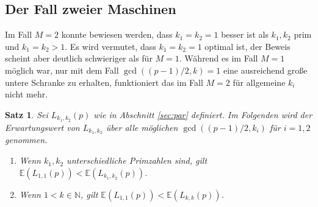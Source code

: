 \documentclass[a4paper, 10pt, ngerman]{article}
\newcommand{\E}{\mathbb{E}}
\newcommand{\N}{\mathbb{N}}
\newtheorem{theorem}{Satz}
\begin{document}
\subsection{Der Fall zweier Maschinen}

Im Fall $M = 2$ konnte bewiesen werden, dass $k_1 = k_2 = 1$ besser ist als $k_1, k_2$ prim und $k_1 = k_2 > 1$. Es wird vermutet, dass $k_1 = k_2 = 1$ optimal ist, der Beweis scheint aber deutlich schwieriger als für $M = 1$. Während es im Fall $M = 1$ möglich war, nur mit dem Fall $\gcd((p - 1)/2, k) = 1$ eine ausreichend große untere Schranke zu erhalten, funktioniert das im Fall $M = 2$ für allgemeine $k_i$ nicht mehr.

\begin{theorem}
    Sei $L_{k_1, k_2}(p)$ wie in Abschnitt \ref{sec:par} definiert. Im Folgenden wird der Erwartungswert von $L_{k_1, k_2}$ über alle möglichen $\gcd((p - 1)/2, k_i)$ für $i = 1, 2$ genommen.
    \begin{enumerate}
        \item Wenn $k_1, k_2$ unterschiedliche Primzahlen sind, gilt $\E(L_{1, 1}(p)) < \E(L_{k_1, k_2}(p))$.
        \item Wenn $1 < k \in \N$, gilt $\E(L_{1, 1}(p)) < \E(L_{k, k}(p))$.
    \end{enumerate}
\end{theorem}
\end{document}
